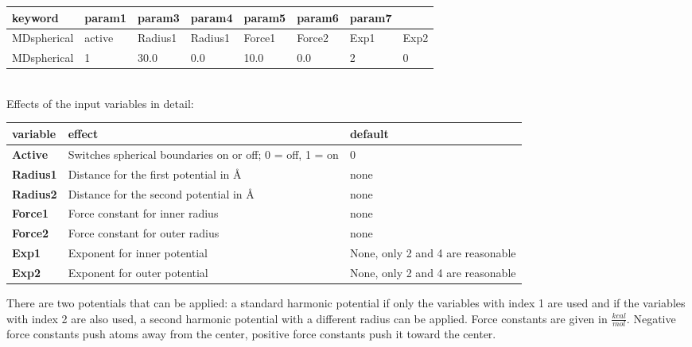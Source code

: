 \documentclass[10pt,a4paper]{article} %
\begin{document}
	\begin{longtable}{l|l|l|l|l|l|l|l}
		keyword & param1 & param3 & param4 & param5 & param6 & param7 \\
		\hline
		MDspherical & active & Radius1 & Radius1 & Force1 & Force2 & Exp1 & Exp2 \\
		MDspherical & 1 & 30.0 & 0.0 & 10.0 & 0.0 & 2 & 0 \\
	\end{longtable}~\\

	Effects of the input variables in detail:
	\begin{longtable}{|p{3cm}|p{5cm}|p{3cm}|}
		\textbf{variable} & effect & default \\
		\hline
		\textbf{Active} & Switches spherical boundaries on or off; 0 = off, 1 = on & 0 \\
		\textbf{Radius1} & Distance for the first potential in \AA & none \\
		\textbf{Radius2} & Distance for the second potential in \AA & none \\
		\textbf{Force1} & Force constant for inner radius & none \\
		\textbf{Force2} & Force constant for outer radius & none \\
		\textbf{Exp1} & Exponent for inner potential & None, only 2 and 4 are reasonable \\
		\textbf{Exp2} & Exponent for outer potential & None, only 2 and 4 are reasonable \\
	\end{longtable}
	There are two potentials that can be applied: a standard harmonic potential if only the variables with index 1 are used and if the variables with index 2 are also used, a second harmonic potential with a different radius can be applied.
	Force constants are given in $\frac{kcal}{mol}$. Negative force constants push atoms away from the center, positive force constants push it toward the center.
\end{document}
